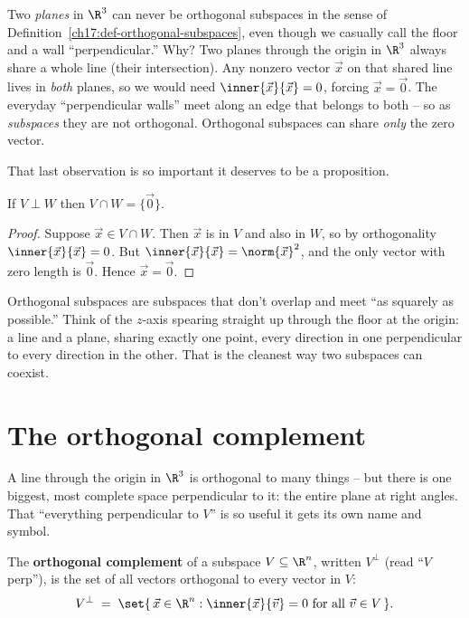 \begin{trapbox}
Two \emph{planes} in $\R^3$ can never be orthogonal subspaces in the sense of
Definition~\ref{ch17:def-orthogonal-subspaces}, even though we casually call the floor and a wall
``perpendicular.'' Why? Two planes through the origin in $\R^3$ always share a whole line (their
intersection). Any nonzero vector $\vec{x}$ on that shared line lives in \emph{both} planes, so we
would need $\inner{\vec{x}}{\vec{x}}=0$, forcing $\vec{x}=\vec{0}$. The everyday ``perpendicular
walls'' meet along an edge that belongs to both -- so as \emph{subspaces} they are not orthogonal.
Orthogonal subspaces can share \emph{only} the zero vector.
\end{trapbox}

That last observation is so important it deserves to be a proposition.

\begin{proposition}\label{ch17:trivial-intersection}
If $V\perp W$ then $V\cap W = \{\vec{0}\}$.
\end{proposition}

\begin{proof}
Suppose $\vec{x}\in V\cap W$. Then $\vec{x}$ is in $V$ and also in $W$, so by orthogonality
$\inner{\vec{x}}{\vec{x}}=0$. But $\inner{\vec{x}}{\vec{x}}=\norm{\vec{x}}^2$, and the only vector
with zero length is $\vec{0}$. Hence $\vec{x}=\vec{0}$.
\end{proof}

\begin{intuitionbox}
Orthogonal subspaces are subspaces that don't overlap and meet ``as squarely as possible.'' Think
of the $z$-axis spearing straight up through the floor at the origin: a line and a plane, sharing
exactly one point, every direction in one perpendicular to every direction in the other. That is
the cleanest way two subspaces can coexist.
\end{intuitionbox}

\section{The orthogonal complement}

A line through the origin in $\R^3$ is orthogonal to many things -- but there is one biggest,
most complete space perpendicular to it: the entire plane at right angles. That ``everything
perpendicular to $V$'' is so useful it gets its own name and symbol.

\begin{definition}\label{ch17:def-complement}
The \textbf{orthogonal complement} of a subspace $V\subseteq\R^n$, written $V^{\perp}$ (read
``$V$ perp''), is the set of all vectors orthogonal to every vector in $V$:
\[
  V^{\perp} \;=\; \set{\,\vec{x}\in\R^n : \inner{\vec{x}}{\vec{v}}=0 \text{ for all }\vec{v}\in V\,}.
\]
\end{definition}

